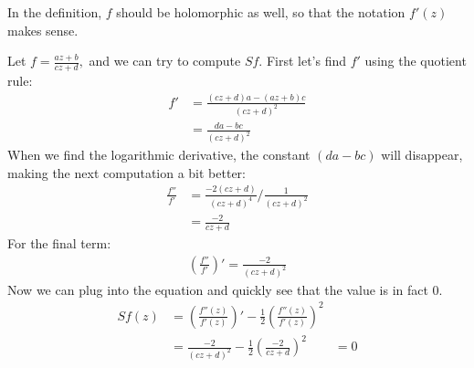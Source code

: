 \documentclass{homework}
\begin{document}
\begin{solution}
In the definition, $f$ should be holomorphic as well, so that the notation $f'(z)$ makes sense.

Let $f=\frac{az + b}{cz + d},$ and we can try to compute $Sf$. First let's find $f'$ using the quotient rule:
\begin{align*}
f' &= \frac{(cz + d)a - (az + b)c}{(cz + d)^2}\\
&= \frac{da - bc}{(cz + d)^2}
\end{align*}
When we find the logarithmic derivative, the constant $(da - bc)$ will disappear, making the next computation a bit better:
\begin{align*}
\frac{f''}{f'} &= \frac{-2(cz + d)}{(cz+d)^4} / \frac{1}{(cz+d)^2}\\
&= \frac{-2}{cz + d}
\end{align*}
For the final term:
\begin{align*}
(\frac{f''}{f'})' = \frac{-2}{(cz + d)^2}
\end{align*}
Now we can plug into the equation and quickly see that the value is in fact 0.
\begin{align*}
Sf(z) &= \left({\frac{f''(z)}{f'(z)}}\right)'-{\frac12}\left(\frac{f''(z)}{f'(z)}\right)^2\\
&= \frac{-2}{(cz + d)^2} - \frac{1}{2}(\frac{-2}{cz + d})^2
&= 0
\end{align*}
\end{solution}
\end{document}
